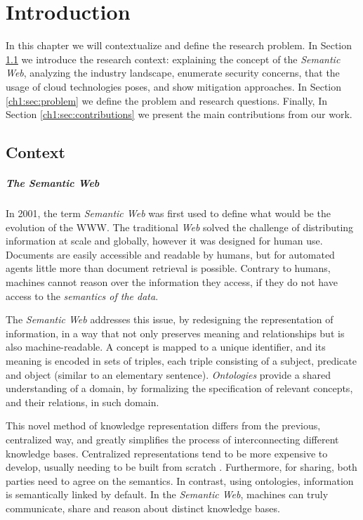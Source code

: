 

\chapter{Introduction}
\label{cha:introduction}

In this chapter we will contextualize and define the research problem. In Section \ref{ch1:sec:context} we introduce the research context: explaining the concept of the \emph{Semantic Web}, analyzing the industry landscape, enumerate security concerns, that the usage of cloud technologies poses, and show mitigation approaches.  In Section \ref{ch1:sec:problem} we define the problem and research questions. Finally, In Section \ref{ch1:sec:contributions} we present the main contributions from our work.

\section{Context}
\label{ch1:sec:context}

\paragraph{The Semantic Web} In 2001, the term \emph{Semantic Web} \autocite{Berners-Lee2001-ux} was first used to define what would be the evolution of the \gls{WWW}. The traditional \emph{Web} solved the challenge of distributing information at scale and globally, however it was designed for human use. Documents are easily accessible and readable by humans, but for automated agents little more than document retrieval is possible. Contrary to humans, machines cannot reason over the information they access, if they do not have access to the \emph{semantics of the data}.

The \emph{Semantic Web} addresses this issue, by redesigning the representation of information, in a way that not only preserves meaning and relationships but is also machine-readable.
A concept is mapped to a unique identifier, and its meaning is encoded in sets of triples, each triple consisting of a subject, predicate and object (similar to an elementary sentence). \emph{Ontologies} provide a shared understanding of a domain, by formalizing the specification of relevant concepts, and their relations, in such domain.

This novel method of knowledge representation differs from the previous, centralized way, and greatly simplifies the process of interconnecting different knowledge bases. Centralized representations tend to be more expensive to develop, usually needing to be built from scratch \autocite{Neches1991-lx}. Furthermore, for sharing, both parties need to agree on the semantics. In contrast, using ontologies, information is semantically linked by default. In the \emph{Semantic Web}, machines can truly communicate, share and reason about distinct knowledge bases.

